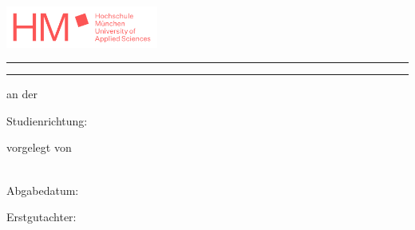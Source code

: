 \thispagestyle{empty}

\begin{minipage}[c][\textheight][s]{\textwidth}

\begin{flushright}
\includegraphics[width=5cm,keepaspectratio]{logos/hm_logo.png}
\end{flushright}

\vspace{0.5cm}

\noindent\rule{\linewidth}{0.4mm}

\vspace{0.5cm}

\begin{flushright}
  \sffamily\bfseries\Large
  \parbox{0.9\textwidth}{\raggedleft\getTitle}
  
  \vspace{0.3cm}
  
\end{flushright}

\vspace{0.5cm}

\noindent\rule{\linewidth}{0.4mm}

\vspace{0.5cm}

\begin{center}
  \sffamily\bfseries\large
  \getTitleen
\end{center}

\vfill

\begin{center}
  \large
  {\bfseries\Large \getDoctype}
  
  \vspace{0.3cm}
  
  an der \getUniversity\\
  \getFaculty
  
  \vspace{0.5cm}
  
  Studienrichtung: \getCourse
  
  \vspace{0.5cm}
  
  vorgelegt von\\
  \getAuthor\ 
  
  \vfill
  
  Abgabedatum: \getSubmissionDate
  
  \vspace{0.5cm}
  
  Erstgutachter: \getSupervisor
\end{center}

\end{minipage}
\clearpage